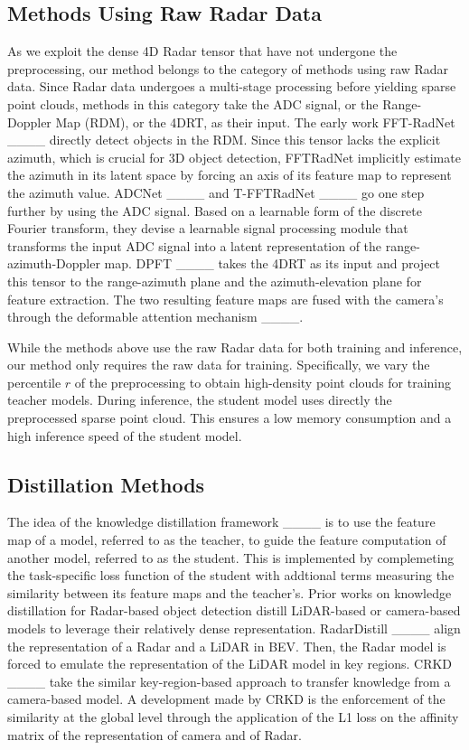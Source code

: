 \subsection{Methods Using Raw Radar Data}
As we exploit the dense 4D Radar tensor that have not undergone the preprocessing, our method belongs to the category of methods using raw Radar data.
Since Radar data undergoes a multi-stage processing before yielding sparse point clouds, methods in this category take the ADC signal, or the Range-Doppler Map (RDM), or the 4DRT, as their input.
The early work FFT-RadNet ____ directly detect objects in the RDM.
Since this tensor lacks the explicit azimuth, which is crucial for 3D object detection, FFTRadNet implicitly estimate the azimuth in its latent space by forcing an axis of its feature map to represent the azimuth value.
ADCNet ____ and T-FFTRadNet ____ go one step further by using the ADC signal.
Based on a learnable form of the discrete Fourier transform, they devise a learnable signal processing module that transforms the input ADC signal into a latent representation of the range-azimuth-Doppler map.
DPFT ____ takes the 4DRT as its input and project this tensor to the range-azimuth plane and the azimuth-elevation plane for feature extraction.
The two resulting feature maps are fused with the camera's through the deformable attention mechanism ____.

While the methods above use the raw Radar data for both training and inference, our method only requires the raw data for training.
Specifically, we vary the percentile $r$ of the preprocessing to obtain high-density point clouds for training teacher models.
During inference, the student model uses directly the preprocessed sparse point cloud.
This ensures a low memory consumption and a high inference speed of the student model.

\subsection{Distillation Methods}
The idea of the knowledge distillation framework ____ is to use the feature map of a model, referred to as the teacher, to guide the feature computation of another model, referred to as the student.
This is implemented by complemeting the task-specific loss function of the student with addtional terms measuring the similarity between its feature maps and the teacher's.
Prior works on knowledge distillation for Radar-based object detection distill LiDAR-based or camera-based models to leverage their relatively dense representation.
RadarDistill ____ align the representation of a Radar and a LiDAR in BEV.
Then, the Radar model is forced to emulate the representation of the LiDAR model in key regions.
CRKD ____ take the similar key-region-based approach to transfer knowledge from a camera-based model.
A development made by CRKD is the enforcement of the similarity at the global level through the application of the L1 loss on the affinity matrix of the representation of camera and of Radar.

